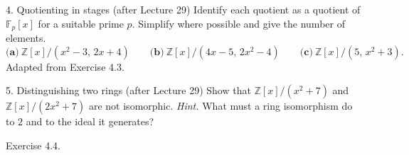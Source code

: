 \documentclass[11pt]{article}
\newcommand{\Z}{\mathbb{Z}}
\newcommand{\F}{\mathbb{F}}
\begin{document}
\begin{exercise}{4. Quotienting in stages (after Lecture 29)}
Identify each quotient as a quotient of $\F_p[x]$ for a suitable prime $p$.
Simplify where possible and give the number of elements.
\[
  \textbf{(a)}\ \Z[x]/(x^2-3,\,2x+4)
  \qquad
  \textbf{(b)}\ \Z[x]/(4x-5,\,2x^2-4)
  \qquad
  \textbf{(c)}\ \Z[x]/(5,\,x^2+3).
\]
{\small\color{darkgray}Adapted from Exercise 4.3.}
\end{exercise}

\begin{exercise}{5. Distinguishing two rings (after Lecture 29)}
Show that $\Z[x]/(x^2+7)$ and $\Z[x]/(2x^2+7)$ are not isomorphic.
\textit{Hint.} What must a ring isomorphism do to $2$ and to the ideal it
generates?
\par
{\small\color{darkgray}Exercise 4.4.}
\end{exercise}
\end{document}
